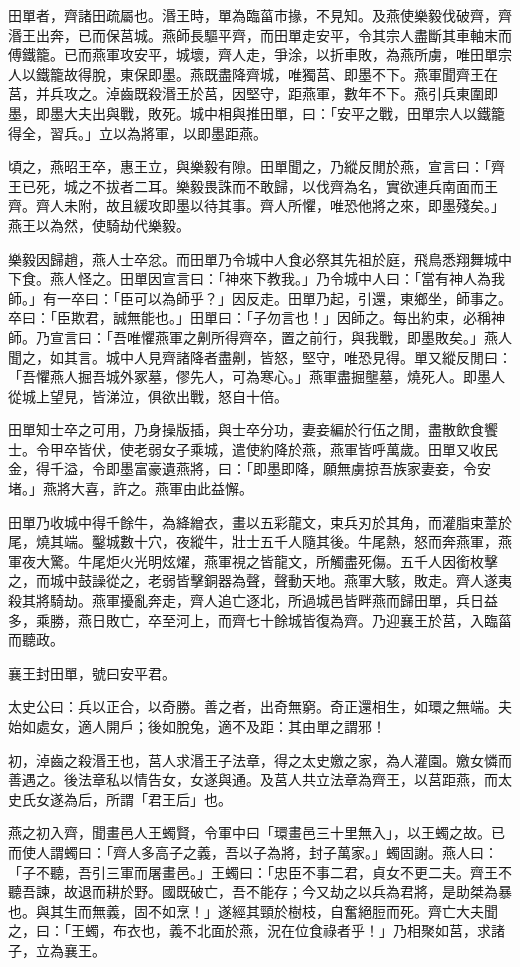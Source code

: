 
\begin{pinyinscope}
田單者，齊諸田疏屬也。湣王時，單為臨菑市掾，不見知。及燕使樂毅伐破齊，齊湣王出奔，已而保莒城。燕師長驅平齊，而田單走安平，令其宗人盡斷其車軸末而傅鐵籠。已而燕軍攻安平，城壞，齊人走，爭涂，以折車敗，為燕所虜，唯田單宗人以鐵籠故得脫，東保即墨。燕既盡降齊城，唯獨莒、即墨不下。燕軍聞齊王在莒，并兵攻之。淖齒既殺湣王於莒，因堅守，距燕軍，數年不下。燕引兵東圍即墨，即墨大夫出與戰，敗死。城中相與推田單，曰：「安平之戰，田單宗人以鐵籠得全，習兵。」立以為將軍，以即墨距燕。

頃之，燕昭王卒，惠王立，與樂毅有隙。田單聞之，乃縱反閒於燕，宣言曰：「齊王已死，城之不拔者二耳。樂毅畏誅而不敢歸，以伐齊為名，實欲連兵南面而王齊。齊人未附，故且緩攻即墨以待其事。齊人所懼，唯恐他將之來，即墨殘矣。」燕王以為然，使騎劫代樂毅。

樂毅因歸趙，燕人士卒忿。而田單乃令城中人食必祭其先祖於庭，飛鳥悉翔舞城中下食。燕人怪之。田單因宣言曰：「神來下教我。」乃令城中人曰：「當有神人為我師。」有一卒曰：「臣可以為師乎？」因反走。田單乃起，引還，東鄉坐，師事之。卒曰：「臣欺君，誠無能也。」田單曰：「子勿言也！」因師之。每出約束，必稱神師。乃宣言曰：「吾唯懼燕軍之劓所得齊卒，置之前行，與我戰，即墨敗矣。」燕人聞之，如其言。城中人見齊諸降者盡劓，皆怒，堅守，唯恐見得。單又縱反閒曰：「吾懼燕人掘吾城外冢墓，僇先人，可為寒心。」燕軍盡掘壟墓，燒死人。即墨人從城上望見，皆涕泣，俱欲出戰，怒自十倍。

田單知士卒之可用，乃身操版插，與士卒分功，妻妾編於行伍之閒，盡散飲食饗士。令甲卒皆伏，使老弱女子乘城，遣使約降於燕，燕軍皆呼萬歲。田單又收民金，得千溢，令即墨富豪遺燕將，曰：「即墨即降，願無虜掠吾族家妻妾，令安堵。」燕將大喜，許之。燕軍由此益懈。

田單乃收城中得千餘牛，為絳繒衣，畫以五彩龍文，束兵刃於其角，而灌脂束葦於尾，燒其端。鑿城數十穴，夜縱牛，壯士五千人隨其後。牛尾熱，怒而奔燕軍，燕軍夜大驚。牛尾炬火光明炫燿，燕軍視之皆龍文，所觸盡死傷。五千人因銜枚擊之，而城中鼓譟從之，老弱皆擊銅器為聲，聲動天地。燕軍大駭，敗走。齊人遂夷殺其將騎劫。燕軍擾亂奔走，齊人追亡逐北，所過城邑皆畔燕而歸田單，兵日益多，乘勝，燕日敗亡，卒至河上，而齊七十餘城皆復為齊。乃迎襄王於莒，入臨菑而聽政。

襄王封田單，號曰安平君。

太史公曰：兵以正合，以奇勝。善之者，出奇無窮。奇正還相生，如環之無端。夫始如處女，適人開戶；後如脫兔，適不及距：其由單之謂邪！

初，淖齒之殺湣王也，莒人求湣王子法章，得之太史嬓之家，為人灌園。嬓女憐而善遇之。後法章私以情告女，女遂與通。及莒人共立法章為齊王，以莒距燕，而太史氏女遂為后，所謂「君王后」也。

燕之初入齊，聞畫邑人王蠋賢，令軍中曰「環畫邑三十里無入」，以王蠋之故。已而使人謂蠋曰：「齊人多高子之義，吾以子為將，封子萬家。」蠋固謝。燕人曰：「子不聽，吾引三軍而屠畫邑。」王蠋曰：「忠臣不事二君，貞女不更二夫。齊王不聽吾諫，故退而耕於野。國既破亡，吾不能存；今又劫之以兵為君將，是助桀為暴也。與其生而無義，固不如烹！」遂經其頸於樹枝，自奮絕脰而死。齊亡大夫聞之，曰：「王蠋，布衣也，義不北面於燕，況在位食祿者乎！」乃相聚如莒，求諸子，立為襄王。


\end{pinyinscope}